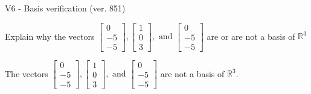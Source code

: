\begin{exercise}
  \begin{exerciseTitle}V6 - Basis verification (ver. 851)\end{exerciseTitle}
  \begin{exerciseStatement}
    Explain why the vectors \(\left[\begin{array}{r}
0 \\
-5 \\
-5
\end{array}\right] , \left[\begin{array}{r}
1 \\
0 \\
3
\end{array}\right] , \text{ and } \left[\begin{array}{r}
0 \\
-5 \\
-5
\end{array}\right]\) are or are not a basis of \(\mathbb{R}^3\)	


  \end{exerciseStatement}
  \begin{exerciseAnswer}
   The vectors \(\left[\begin{array}{r}
0 \\
-5 \\
-5
\end{array}\right] , \left[\begin{array}{r}
1 \\
0 \\
3
\end{array}\right] , \text{ and } \left[\begin{array}{r}
0 \\
-5 \\
-5
\end{array}\right]\) 
  	 are not  a basis of \(\mathbb{R}^3\).
  


  \end{exerciseAnswer}
\end{exercise}
